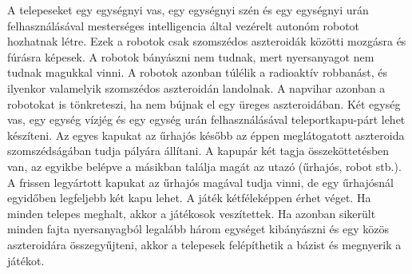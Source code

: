 {}A telepeseket egy egységnyi vas, egy egységnyi szén és egy egységnyi urán felhasználásával mesterséges intelligencia által vezérelt autonóm robotot hozhatnak létre. Ezek a robotok csak szomszédos aszteroidák közötti mozgásra és fúrásra képesek. A robotok bányászni nem tudnak, mert nyersanyagot nem tudnak magukkal vinni. A robotok azonban túlélik a radioaktív robbanást, és ilyenkor valamelyik szomszédos aszteroidán landolnak. A napvihar azonban a robotokat is tönkreteszi, ha nem bújnak el egy üreges aszteroidában.\markdownRendererInterblockSeparator
{}Két egység vas, egy egység vízjég és egy egység urán felhasználásával teleportkapu-párt lehet készíteni. Az egyes kapukat az űrhajós később az éppen meglátogatott aszteroida szomszédságában tudja pályára állítani. A kapupár két tagja összeköttetésben van, az egyikbe belépve a másikban találja magát az utazó (űrhajós, robot stb.). A frissen legyártott kapukat az űrhajós magával tudja vinni, de egy űrhajósnál egyidőben legfeljebb két kapu lehet.\markdownRendererInterblockSeparator
{}A játék kétféleképpen érhet véget. Ha minden telepes meghalt, akkor a játékosok veszítettek. Ha azonban sikerült minden fajta nyersanyagból legalább három egységet kibányászni és egy közös aszteroidára összegyűjteni, akkor a telepesek felépíthetik a bázist és megnyerik a játékot.\relax